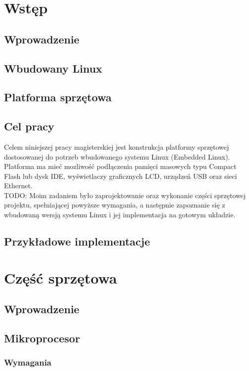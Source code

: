 \documentclass[a4paper]{report}
\begin{document}
	\tableofcontents
	
	\newpage
	\chapter{Wstęp}
		\section{Wprowadzenie}
		\section{Wbudowany Linux}
		\section{Platforma sprzętowa}
		\section{Cel pracy}
			Celem niniejszej pracy magisterskiej jest konstrukcja platformy sprzętowej dostosowanej do potrzeb wbudowanego systemu Linux (Embedded Linux). Platforma ma mieć mozliwość podłączenia pamięci masowych typu Compact  Flash lub dysk IDE, wyświetlaczy graficznych LCD, urządzeń USB oraz sieci Ethernet.\\
			TODO: Moim zadaniem było zaprojektowanie oraz wykonanie części sprzętowej projektu, spełniającej powyższe wymagania, a następnie zapoznanie się z wbudowaną wersją systemu Linux i jej implementacja na gotowym układzie.\\

		\section{Przykładowe implementacje}

	\chapter{Część sprzętowa}
		\section{Wprowadzenie}
		\section{Mikroprocesor}
			\subsection{Wymagania}
\end{document}
